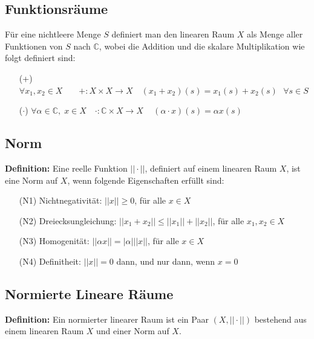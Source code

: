 \documentclass[11pt]{article}
\begin{document}
\subsection*{Funktionsräume}
\vspace*{-0.5cm}
Für eine nichtleere Menge $S$ definiert man den linearen Raum $X$ als Menge aller Funktionen von $S$ nach $\mathbb{C}$, wobei die Addition und die skalare Multiplikation wie folgt definiert sind:
\vspace*{-0.5cm}
\begin{itemize}
    \item[(+)] $\forall x_1, x_2 \in X \hspace{23pt} +:X \times X \to X \hspace{12pt} (x_1 + x_2)(s) = x_1(s) + x_2(s) \hspace{8pt} \forall s \in S$
    \item[($\cdot$)] $\forall \alpha \in \mathbb{C}, \; x \in X \hspace{12pt} \cdot : \mathbb{C} \times X \to X \hspace{14pt} (\alpha \cdot x)(s) = \alpha x(s)$
\end{itemize}

\subsection*{Norm}
\vspace*{-0.5cm}
\textbf{Definition:} Eine reelle Funktion $||\cdot ||$, definiert auf einem linearen Raum $X$, ist eine Norm auf $X$, wenn folgende Eigenschaften erfüllt sind:
\vspace*{-0.5cm}
\begin{itemize}
    \item[(N1)] Nichtnegativität: $||x|| \geq 0$, für alle $x\in X$
    \item[(N2)] Dreiecksungleichung: $||x_1 + x_2|| \leq ||x_1|| + ||x_2||$, für alle $x_1, x_2\in X$
    \item[(N3)] Homogenität: $||\alpha x|| = |\alpha| ||x||$, für alle $x\in X$
    \item[(N4)] Definitheit: $||x||=0$ dann, und nur dann, wenn $x=0$
\end{itemize}

\subsection*{Normierte Lineare Räume}
\vspace*{-0.5cm}
\textbf{Definition:} Ein normierter linearer Raum ist ein Paar $(X, ||\cdot||)$ bestehend aus einem linearen Raum $X$ und einer Norm auf $X$.
\end{document}
